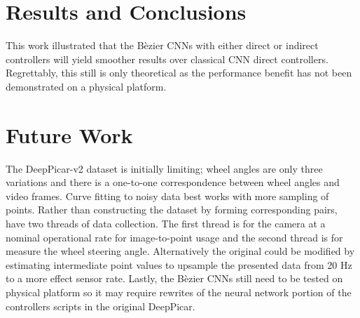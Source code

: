 \documentclass[conference]{IEEEtran}
\begin{document}
\section{Results and Conclusions}

This work illustrated that the B\`ezier CNNs with either direct or indirect controllers will yield smoother results over classical CNN direct controllers. Regrettably, this still is only theoretical as the performance benefit has not been demonstrated on a physical platform.

\section{Future Work}

The DeepPicar-v2 dataset is initially limiting; wheel angles are only three variations and there is a one-to-one correspondence between wheel angles and video frames. Curve fitting to noisy data best works with more sampling of points. Rather than constructing the dataset by forming corresponding pairs, have two threads of data collection. The first thread is for the camera at a nominal operational rate for image-to-point usage and the second thread is for measure the wheel steering angle. Alternatively the original \cite{bechtel2018} could be modified by estimating intermediate point values to upsample the presented data from 20 Hz to a more effect sensor rate. Lastly, the B\`ezier CNNs still need to be tested on physical platform so it may require rewrites of the neural network portion of the controllers scripts in the original DeepPicar.



\end{document}
